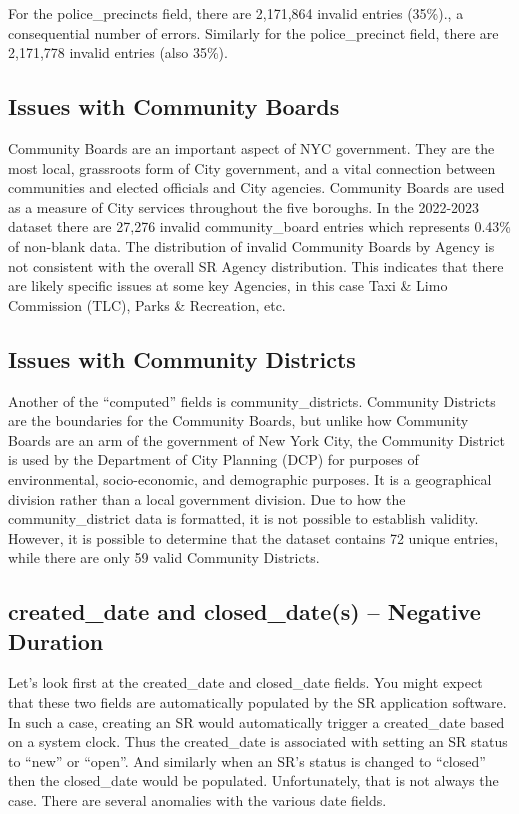 \documentclass[12pt, titlepage]{article}
\begin{document}
	For the police\_precincts field, there are 2,171,864 invalid entries 
	(35\%)., a consequential number of errors. Similarly for the 
	police\_precinct field, there are 2,171,778 invalid entries 
	(also 35\%). 
	
\subsection{Issues with Community Boards}
\label{sec:communityboards}
	Community Boards are an important aspect of NYC government. They are the 
	most local, grassroots form of City government, and a vital connection 
	between communities and elected officials and City agencies. Community 
	Boards are used as a measure of City services throughout the five 
	boroughs. In the 2022-2023 dataset there are 27,276 invalid community\_board 
	entries which represents 0.43\% of non-blank data. The distribution 
	of invalid Community Boards by Agency is not consistent with 
	the overall SR Agency distribution. This indicates that there are likely 
	specific issues at some key Agencies, in this case Taxi \& Limo 
	Commission (TLC), Parks \& Recreation, etc. 

\subsection{Issues with Community Districts}
\label{sec:communitydistrict}
	Another of the ``computed'' fields is community\_districts. Community Districts 
	are the boundaries for the Community Boards, but unlike how 
	Community Boards are an arm of the government of New York City, 
	the Community District is used by the Department of City Planning 
	(DCP) for purposes of environmental, socio-economic, and demographic 
	purposes. It is a geographical division rather than a local 
	government division. Due to how the community\_district data 
	is formatted, it is not possible to establish validity. However, 
	it is possible to determine that the dataset contains 72 unique 
	entries, while there are only 59 valid Community Districts. 
	
\subsection{created\_date and closed\_date(s) -- Negative Duration}
\label{sec:negativeduration}
	Let's look first at the created\_date and closed\_date fields. You might 
	expect that these two fields are automatically populated by the 
	SR application software. In such a case, creating an SR would 
	automatically trigger a created\_date based on a system clock. 
	Thus the created\_date is associated with setting an SR status 
	to ``new'' or ``open''. And similarly when an SR's 	status is 
	changed to ``closed'' then the closed\_date would be 
	populated. Unfortunately, that is not always the case. There are
	several anomalies with the various date fields.
	
\end{document}
